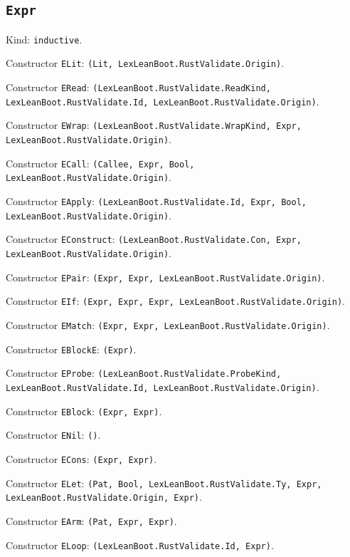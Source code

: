 \documentclass[11pt]{article}
\begin{document}
\subsection*{\texttt{Expr}}
\noindent Kind: \texttt{inductive}.\par
\noindent Constructor \texttt{ELit}: \texttt{(Lit, LexLeanBoot.RustValidate.Origin)}.\par
\noindent Constructor \texttt{ERead}: \texttt{(LexLeanBoot.RustValidate.ReadKind, LexLeanBoot.RustValidate.Id, LexLeanBoot.RustValidate.Origin)}.\par
\noindent Constructor \texttt{EWrap}: \texttt{(LexLeanBoot.RustValidate.WrapKind, Expr, LexLeanBoot.RustValidate.Origin)}.\par
\noindent Constructor \texttt{ECall}: \texttt{(Callee, Expr, Bool, LexLeanBoot.RustValidate.Origin)}.\par
\noindent Constructor \texttt{EApply}: \texttt{(LexLeanBoot.RustValidate.Id, Expr, Bool, LexLeanBoot.RustValidate.Origin)}.\par
\noindent Constructor \texttt{EConstruct}: \texttt{(LexLeanBoot.RustValidate.Con, Expr, LexLeanBoot.RustValidate.Origin)}.\par
\noindent Constructor \texttt{EPair}: \texttt{(Expr, Expr, LexLeanBoot.RustValidate.Origin)}.\par
\noindent Constructor \texttt{EIf}: \texttt{(Expr, Expr, Expr, LexLeanBoot.RustValidate.Origin)}.\par
\noindent Constructor \texttt{EMatch}: \texttt{(Expr, Expr, LexLeanBoot.RustValidate.Origin)}.\par
\noindent Constructor \texttt{EBlockE}: \texttt{(Expr)}.\par
\noindent Constructor \texttt{EProbe}: \texttt{(LexLeanBoot.RustValidate.ProbeKind, LexLeanBoot.RustValidate.Id, LexLeanBoot.RustValidate.Origin)}.\par
\noindent Constructor \texttt{EBlock}: \texttt{(Expr, Expr)}.\par
\noindent Constructor \texttt{ENil}: \texttt{()}.\par
\noindent Constructor \texttt{ECons}: \texttt{(Expr, Expr)}.\par
\noindent Constructor \texttt{ELet}: \texttt{(Pat, Bool, LexLeanBoot.RustValidate.Ty, Expr, LexLeanBoot.RustValidate.Origin, Expr)}.\par
\noindent Constructor \texttt{EArm}: \texttt{(Pat, Expr, Expr)}.\par
\noindent Constructor \texttt{ELoop}: \texttt{(LexLeanBoot.RustValidate.Id, Expr)}.\par
\end{document}
